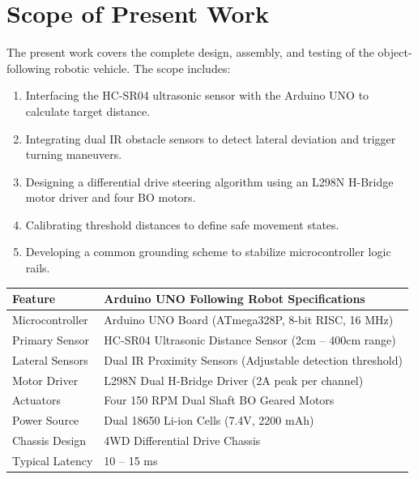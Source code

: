 \documentclass[12pt,a4paper,oneside]{report}
\begin{document}
\section{Scope of Present Work}
The present work covers the complete design, assembly, and testing of the object-following robotic vehicle. The scope includes:
\begin{enumerate}[noitemsep,topsep=2pt,parsep=0pt,partopsep=0pt]
    \item Interfacing the HC-SR04 ultrasonic sensor with the Arduino UNO to calculate target distance.
    \item Integrating dual IR obstacle sensors to detect lateral deviation and trigger turning maneuvers.
    \item Designing a differential drive steering algorithm using an L298N H-Bridge motor driver and four BO motors.
    \item Calibrating threshold distances to define safe movement states.
    \item Developing a common grounding scheme to stabilize microcontroller logic rails.
\end{enumerate}
\vspace{0.05in}
\begin{center}
\fontsize{9.0}{10.5}\selectfont
\begin{tabular}{|C{3.2cm}|C{11.2cm}|}
\hline
\textbf{Feature} & \textbf{Arduino UNO Following Robot Specifications} \\ \hline
Microcontroller & Arduino UNO Board (ATmega328P, 8-bit RISC, 16 MHz) \\ \hline
Primary Sensor & HC-SR04 Ultrasonic Distance Sensor (2cm -- 400cm range) \\ \hline
Lateral Sensors & Dual IR Proximity Sensors (Adjustable detection threshold) \\ \hline
Motor Driver & L298N Dual H-Bridge Driver (2A peak per channel) \\ \hline
Actuators & Four 150 RPM Dual Shaft BO Geared Motors \\ \hline
Power Source & Dual 18650 Li-ion Cells (7.4V, 2200 mAh) \\ \hline
Chassis Design & 4WD Differential Drive Chassis \\ \hline
Typical Latency & 10 -- 15 ms \\ \hline
\end{tabular}
\vspace{0.05in}
\label{tab:comparison}
\end{center}
\clearpage
\end{document}

